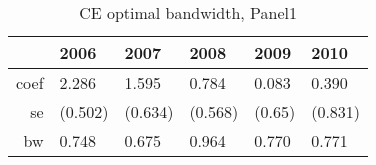 \begin{table}[ht]
\centering
\begin{tabular}{rlllll}
  \hline
 & 2006 & 2007 & 2008 & 2009 & 2010 \\ 
  \hline
coef & 2.286 & 1.595 & 0.784 & 0.083 & 0.390 \\ 
  se & (0.502) & (0.634) & (0.568) & (0.65) & (0.831) \\ 
  bw & 0.748 & 0.675 & 0.964 & 0.770 & 0.771 \\ 
   \hline
\end{tabular}
\caption{CE optimal bandwidth, Panel1}
\label{tab:rdrobust_panel1}
\end{table}
